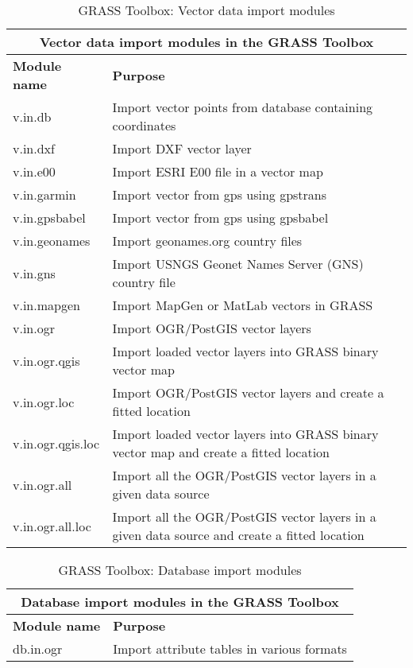 \begin{table}[htb]
\centering
 \begin{tabular}{|p{2.5cm}|p{11.5cm}|}
  \hline \multicolumn{2}{|c|}{\textbf{Vector data import modules in the GRASS
Toolbox}} \\
  \hline \textbf{Module name} & \textbf{Purpose} \\
  \hline v.in.db & Import vector points from database containing coordinates \\
  \hline v.in.dxf & Import DXF vector layer \\
  \hline v.in.e00 & Import ESRI E00 file in a vector map \\
  \hline v.in.garmin & Import vector from gps using gpstrans \\
  \hline v.in.gpsbabel & Import vector from gps using gpsbabel \\
  \hline v.in.geonames & Import geonames.org country files \\
  \hline v.in.gns & Import USNGS Geonet Names Server (GNS) country file  \\
  \hline v.in.mapgen & Import MapGen or MatLab vectors in GRASS \\
  \hline v.in.ogr & Import OGR/PostGIS vector layers \\
  \hline v.in.ogr.qgis & Import loaded vector layers into GRASS binary
  vector map \\
  \hline v.in.ogr.loc & Import OGR/PostGIS vector layers and create a fitted
  location \\
  \hline v.in.ogr.qgis.loc & Import loaded vector layers into GRASS binary
  vector map and create a fitted location \\
  \hline v.in.ogr.all & Import all the OGR/PostGIS vector layers in a given
  data source \\
  \hline v.in.ogr.all.loc & Import all the OGR/PostGIS vector layers in a
  given data source and create a fitted location \\
\hline
\end{tabular}
\caption{GRASS Toolbox: Vector data import modules}
\end{table}

\begin{table}[H]
\centering
 \begin{tabular}{|p{2.5cm}|p{11.5cm}|}
  \hline \multicolumn{2}{|c|}{\textbf{Database import modules in the GRASS
Toolbox}} \\
  \hline \textbf{Module name} & \textbf{Purpose} \\
  \hline db.in.ogr & Import attribute tables in various formats \\
\hline
\end{tabular}
\caption{GRASS Toolbox: Database import modules}
\end{table}


